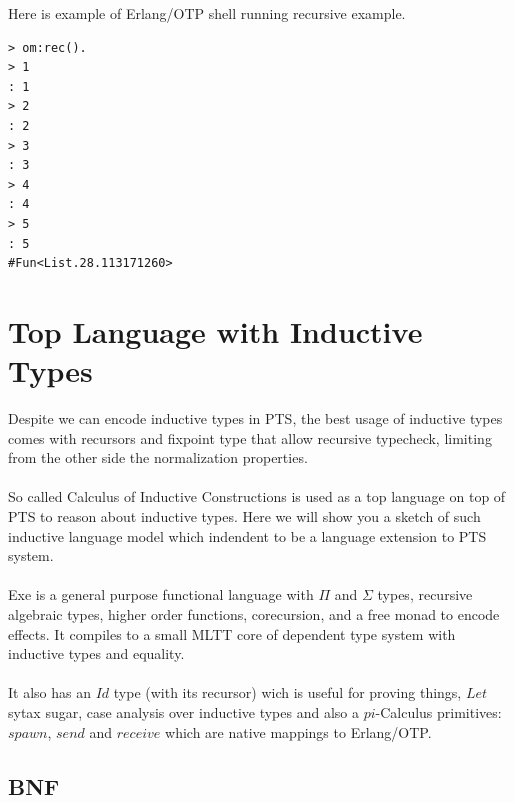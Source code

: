 \documentclass[11pt,oneside]{article}
\begin{document}
Here is example of Erlang/OTP shell running recursive example.

\begin{lstlisting}[mathescape=true]
> om:rec().
> 1
: 1
> 2
: 2
> 3
: 3
> 4
: 4
> 5
: 5
#Fun<List.28.113171260>
\end{lstlisting}




\newpage
\section{Top Language with Inductive Types}

Despite we can encode inductive types in PTS, the best usage of inductive types
comes with recursors and fixpoint type that allow recursive typecheck, limiting
from the other side the normalization properties.

\paragraph{}
So called Calculus of Inductive Constructions is used as a top language on top of
PTS to reason about inductive types. Here we will show you a sketch of such
inductive language model which indendent to be a language extension to PTS system.

\paragraph{}
Exe is a general purpose functional language with $\Pi$ and $\Sigma$ types,
recursive algebraic types, higher order functions,
corecursion, and a free monad to encode effects. It compiles
to a small MLTT core of dependent type system with inductive types and equality.

\paragraph{}
It also has an $Id$ type (with its recursor) wich is useful for proving things,
$Let$ sytax sugar, case analysis over inductive types and also a $pi$-Calculus primitives:
$spawn$, $send$ and $receive$ which are native mappings to Erlang/OTP.

\subsection{BNF}
\end{document}
